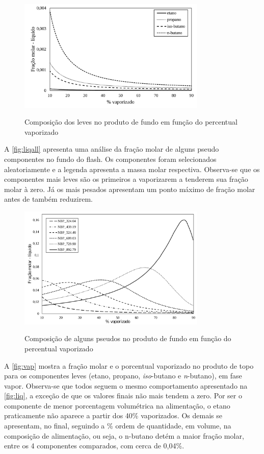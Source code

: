 \clearpage

\begin{figure}[htb]
\centering
{\includegraphics[width=0.8\textwidth]{img/trab3liq.pdf}} 
\caption{Composição dos leves no produto de fundo em função do
percentual vaporizado}
\label{fig:liq}
\end{figure}

A \autoref{fig:liqall} apresenta uma análise da fração molar de alguns pseudo
componentes no fundo do flash. Os componentes foram
selecionados aleatoriamente e a legenda apresenta a massa molar respectiva.
Observa-se que os componentes mais leves são os primeiros a vaporizarem a tenderem sua fração molar à zero. Já os mais pesados apresentam um ponto máximo de fração 
molar antes de também reduzirem.


\begin{figure}[htb] 
\centering
{\includegraphics[width=0.8\textwidth]{img/trab3liqall.pdf}} 
\caption{Composição de alguns pseudos no produto de fundo em função do
percentual vaporizado}
\label{fig:liqall}
\end{figure}

A \autoref{fig:vap} mostra a fração molar e o porcentual vaporizado no produto
de topo para os componentes leves (etano, propano, \emph{iso}-butano e
\emph{n}-butano), em fase vapor.
Observa-se que todos seguem o mesmo comportamento apresentado na
\autoref{fig:liq}, a exceção de que os valores finais não mais tendem a zero.
Por ser o componente de menor porcentagem volumétrica na alimentação, o etano praticamente não aparece
a partir dos 40{\%} vaporizados. Os demais se apresentam, no final, seguindo a
{\%} ordem de quantidade, em volume, na composição de alimentação, ou seja, 
o n-butano detém a maior fração molar, entre os 4 componentes comparados, 
com cerca de 0,04{\%}. 

